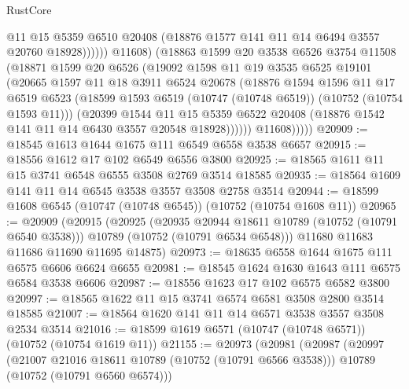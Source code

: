 \begin{lexlean}{RustCore}
\begin{coremodule}
                        @11
                        @15
                        @5359
                        @6510
                        @20408
                        (@18876 @1577 @141 @11 @14 @6494 @3557 @20760 @18928))))))
              @11608)
            (@18863
              @1599
              @20
              @3538
              @6526
              @3754
              @11508
              (@18871
                @1599
                @20
                @6526
                (@19092
                  @1598
                  @11
                  @19
                  @3535
                  @6525
                  @19101
                  (@20665
                    @1597
                    @11
                    @18
                    @3911
                    @6524
                    @20678
                    (@18876
                      @1594
                      @1596
                      @11
                      @17
                      @6519
                      @6523
                      (@18599 @1593 @6519 (@10747 (@10748 @6519)) (@10752 (@10754 @1593 @11)))
                      (@20399
                        @1544
                        @11
                        @15
                        @5359
                        @6522
                        @20408
                        (@18876 @1542 @141 @11 @14 @6430 @3557 @20548 @18928))))))
              @11608)))))
@20909 := @18545 @1613 @1644 @1675 @111 @6549 @6558 @3538 @6657
@20915 := @18556 @1612 @17 @102 @6549 @6556 @3800
@20925 := @18565 @1611 @11 @15 @3741 @6548 @6555 @3508 @2769 @3514 @18585
@20935 := @18564 @1609 @141 @11 @14 @6545 @3538 @3557 @3508 @2758 @3514
@20944 := @18599 @1608 @6545 (@10747 (@10748 @6545)) (@10752 (@10754 @1608 @11))
@20965 := @20909
    (@20915
      (@20925
        (@20935 @20944 @18611 @10789 (@10752 (@10791 @6540 @3538)))
        @10789
        (@10752 (@10791 @6534 @6548)))
      @11680
      @11683
      @11686
      @11690
      @11695
      @14875)
@20973 := @18635 @6558 @1644 @1675 @111 @6575 @6606 @6624 @6655
@20981 := @18545 @1624 @1630 @1643 @111 @6575 @6584 @3538 @6606
@20987 := @18556 @1623 @17 @102 @6575 @6582 @3800
@20997 := @18565 @1622 @11 @15 @3741 @6574 @6581 @3508 @2800 @3514 @18585
@21007 := @18564 @1620 @141 @11 @14 @6571 @3538 @3557 @3508 @2534 @3514
@21016 := @18599 @1619 @6571 (@10747 (@10748 @6571)) (@10752 (@10754 @1619 @11))
@21155 := @20973
    (@20981
      (@20987
        (@20997
          (@21007 @21016 @18611 @10789 (@10752 (@10791 @6566 @3538)))
          @10789
          (@10752 (@10791 @6560 @6574)))

\end{coremodule}
\end{lexlean}
